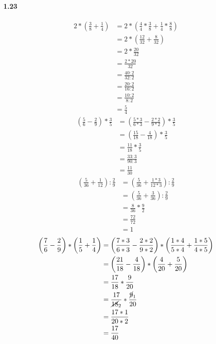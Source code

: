 \documentclass{article}
\begin{document}
\paragraph{1.23}
\begin{align*}
  2 * \left(\frac{3}{8} + \frac{1}{4}\right) &= 2 * \left(\frac{4}{4} * \frac{3}{8} + \frac{1}{4} * \frac{8}{8}\right) \\
  &= 2 * \left(\frac{12}{32} + \frac{8}{32}\right) \\
  &= 2 * \frac{20}{32} \\
  &= \frac{2 * 20}{32} \\
  &= \frac{40:2}{32:2} \\ 
  &= \frac{20:2}{16:2} \\
  &= \frac{10:2}{8:2} \\
  &= \frac{5}{4}
\end{align*}
\begin{align*}
  \left(\frac{5}{6} - \frac{2}{9}\right) * \frac{3}{5} &= \left(\frac{5*3}{6*3} - \frac{2*2}{9*2}\right) * \frac{3}{5} \\
  &= \left(\frac{15}{18} - \frac{4}{18}\right) * \frac{3}{5} \\
  &= \frac{11}{18} * \frac{3}{5} \\
  &= \frac{33:3}{90:3} \\ 
  &= \frac{11}{30}
\end{align*}
\begin{align*}
  \left(\frac{5}{36} + \frac{1}{12}\right) : \frac{2}{9} &= \left(\frac{5}{36} + \frac{1*3}{12*3}\right) : \frac{2}{9} \\
  &= \left(\frac{5}{36} + \frac{3}{36}\right) : \frac{2}{9} \\
  &= \frac{8}{36} * \frac{9}{2} \\
  &= \frac{72}{72} \\
  &= 1
\end{align*}
\begin{align*}
  \left(\frac{7}{6} - \frac{2}{9}\right) * \left(\frac{1}{5} + \frac{1}{4}\right) &= \left(\frac{7*3}{6*3} - \frac{2*2}{9*2}\right) * \left(\frac{1*4}{5*4} + \frac{1*5}{4*5}\right) \\
  &= \left(\frac{21}{18} - \frac{4}{18}\right) * \left(\frac{4}{20} + \frac{5}{20}\right) \\
  &= \frac{17}{18} * \frac{9}{20} \\
  &= \frac{17}{\cancel{18}_2} * \frac{\cancel{9}_1}{20} \\
  &= \frac{17 * 1}{20 * 2} \\
  &= \frac{17}{40}
\end{align*}
\end{document}
